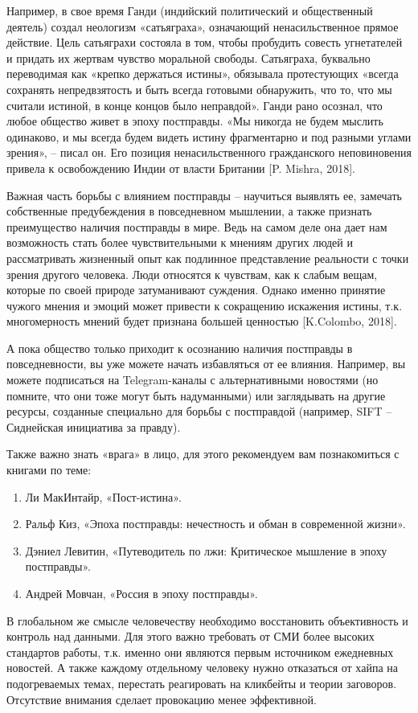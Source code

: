 Например, в свое время Ганди (индийский политический и общественный деятель) создал неологизм «сатьяграха», означающий ненасильственное прямое действие. Цель сатьяграхи состояла в том, чтобы пробудить совесть угнетателей и придать их жертвам чувство моральной свободы. Сатьяграха, буквально переводимая как «крепко держаться истины», обязывала протестующих «всегда сохранять непредвзятость и быть всегда готовыми обнаружить, что то, что мы считали истиной, в конце концов было неправдой». Ганди рано осознал, что любое общество живет в эпоху постправды. «Мы никогда не будем мыслить одинаково, и мы всегда будем видеть истину фрагментарно и под разными углами зрения», – писал он. Его позиция ненасильственного гражданского неповиновения привела к освобождению Индии от власти Британии [P. Mishra, 2018].

Важная часть борьбы с влиянием постправды – научиться выявлять ее, замечать собственные предубеждения в повседневном мышлении, а также признать преимущество наличия постправды в мире. Ведь на самом деле она дает нам возможность стать более чувствительными к мнениям других людей и рассматривать жизненный опыт как подлинное представление реальности с точки зрения другого человека. Люди относятся к чувствам, как к слабым вещам, которые по своей природе затуманивают суждения. Однако именно принятие чужого мнения и эмоций может привести к сокращению искажения истины, т.к. многомерность мнений будет признана большей ценностью [K.Colombo, 2018].

А пока общество только приходит к осознанию наличия постправды в повседневности, вы уже можете начать избавляться от ее влияния. Например, вы можете подписаться на Telegram-каналы с альтернативными новостями (но помните, что они тоже могут быть надуманными) или заглядывать на другие ресурсы, созданные специально для борьбы с постправдой (например, SIFT – Сиднейская инициатива за правду).

Также важно знать «врага» в лицо, для этого рекомендуем вам познакомиться с книгами по теме:

\begin{enumerate}
    \item Ли МакИнтайр, «Пост-истина».
    \item Ральф Киз, «Эпоха постправды: нечестность и обман в современной жизни».
    \item Дэниел Левитин, «Путеводитель по лжи: Критическое мышление в эпоху постправды».
    \item Андрей Мовчан, «Россия в эпоху постправды».
\end{enumerate}
В глобальном же смысле человечеству необходимо восстановить объективность и контроль над данными. Для этого важно требовать от СМИ более высоких стандартов работы, т.к. именно они являются первым источником ежедневных новостей. А также каждому отдельному человеку нужно отказаться от хайпа на подогреваемых темах, перестать реагировать на кликбейты и теории заговоров. Отсутствие внимания сделает провокацию менее эффективной.

